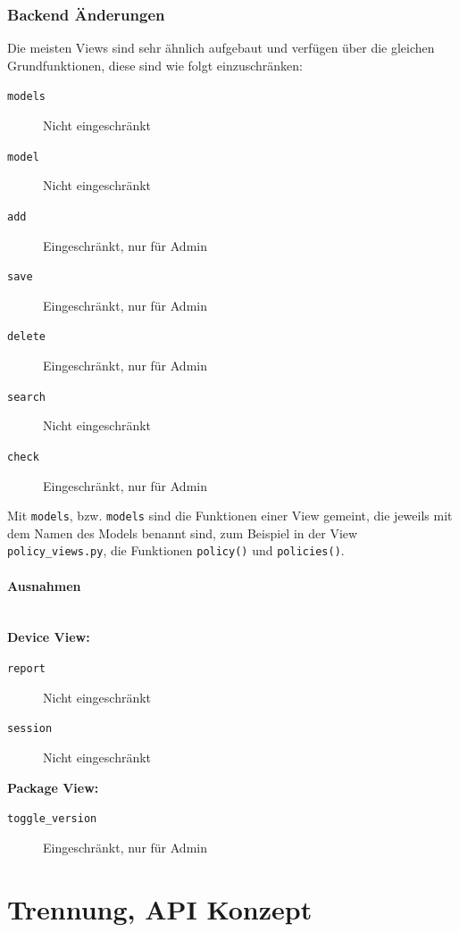 \subsubsection{Backend Änderungen}

Die meisten Views sind sehr ähnlich aufgebaut und verfügen über die gleichen Grundfunktionen, 
diese sind wie folgt einzuschränken:

\begin{description}
    \item [\texttt{models}] Nicht eingeschränkt
    \item [\texttt{model}] Nicht eingeschränkt
    \item [\texttt{add}] Eingeschränkt, nur für Admin
    \item [\texttt{save}] Eingeschränkt, nur für Admin
    \item [\texttt{delete}] Eingeschränkt, nur für Admin
    \item [\texttt{search}] Nicht eingeschränkt
    \item [\texttt{check}] Eingeschränkt, nur für Admin
\end{description}

Mit \texttt{models}, bzw. \texttt{models} sind die Funktionen einer View gemeint, die jeweils mit dem
Namen des Models benannt sind, zum Beispiel in der View \texttt{policy\_views.py}, die Funktionen
\texttt{policy()} und \texttt{policies()}.

\paragraph{Ausnahmen} \hspace{0pt} \\

\textbf{Device View:}
\begin{description}
    \item [\texttt{report} ] Nicht eingeschränkt
    \item [\texttt{session} ] Nicht eingeschränkt
\end{description}

\textbf{Package View:}
\begin{description}
    \item [\texttt{toggle\_version}] Eingeschränkt, nur für Admin
\end{description}



\section{Trennung, API Konzept}

